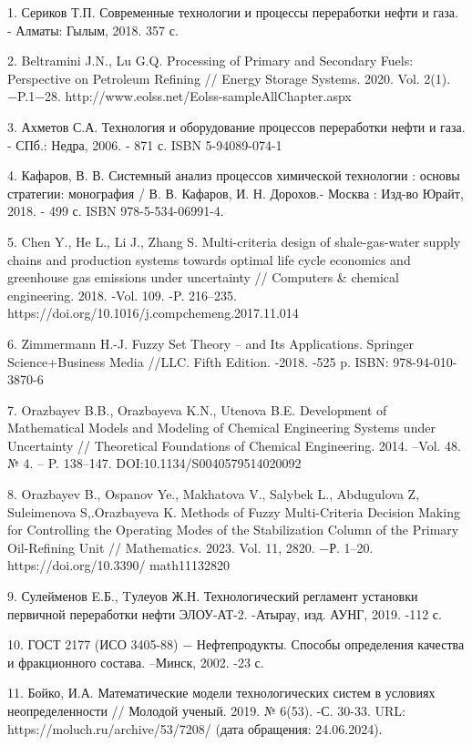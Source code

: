 \begin{noparindent}
1. Сериков Т.П. Современные технологии и процессы переработки нефти и
газа. - Алматы: Гылым, 2018. 357 с.

2. Beltramini J.N., Lu G.Q. Processing of Primary and Secondary Fuels:
Perspective on Petroleum Refining // Energy Storage Systems. 2020. Vol.
2(1). −P.1−28. http://www.eolss.net/Eolss-sampleAllChapter.aspx

3. Ахметов С.А. Технология и оборудование процессов переработки нефти и
газа. - СПб.: Недра, 2006. - 871 с. ISBN 5-94089-074-1

4. Кафаров, В. В. Системный анализ процессов химической технологии :
основы стратегии: монография / В. В. Кафаров, И. Н. Дорохов.- Москва :
Изд-во Юрайт, 2018. - 499 с. ISBN 978-5-534-06991-4.

5. Chen Y., He L., Li J., Zhang S. Multi-criteria design of
shale-gas-water supply chains and production systems towards optimal
life cycle economics and greenhouse gas emissions under uncertainty //
Computers \& chemical engineering. 2018. -Vol. 109. -P. 216--235.
https://doi.org/10.1016/j.compchemeng.2017.11.014

6. Zimmermann H.-J. Fuzzy Set Theory -- and Its Applications. Springer
Science+Business Media //LLC. Fifth Edition. -2018. -525 p. ISBN:
978-94-010-3870-6

7. Orazbayev B.B., Orazbayeva K.N., Utenova B.E. Development of
Mathematical Models and Modeling of Chemical Engineering Systems under
Uncertainty // Theoretical Foundations of Chemical Engineering. 2014.
--Vol. 48. № 4. -- P. 138--147. DOI:10.1134/S0040579514020092

8. Orazbayev B., Ospanov Ye., Makhatova V., Salybek L., Abdugulova Z,
Suleimenova S,.Orazbayeva K. Methods of Fuzzy Multi-Criteria Decision
Making for Controlling the Operating Modes of the Stabilization Column
of the Primary Oil-Refining Unit // Mathematic\emph{s.} 2023. Vol. 11,
2820. −Р. 1--20. \\https://doi.org/10.3390/ math11132820

9. Сулейменов E.Б., Tулеуов Ж.Н. Технологический регламент установки
первичной переработки нефти ЭЛОУ-АТ-2. -Атырау, изд. АУНГ, 2019. -112 с.

10. ГОСТ 2177 (ИСО 3405-88) − Нефтепродукты. Способы определения
качества и фракционного состава. --Минск, 2002. -23 с.

11. Бойко, И.А. Математические модели технологических систем в условиях
неопределенности // Молодой ученый. 2019. № 6(53). -С. 30-33. URL:
https://moluch.ru/archive/53/7208/ (дата обращения: 24.06.2024).


\end{noparindent}
